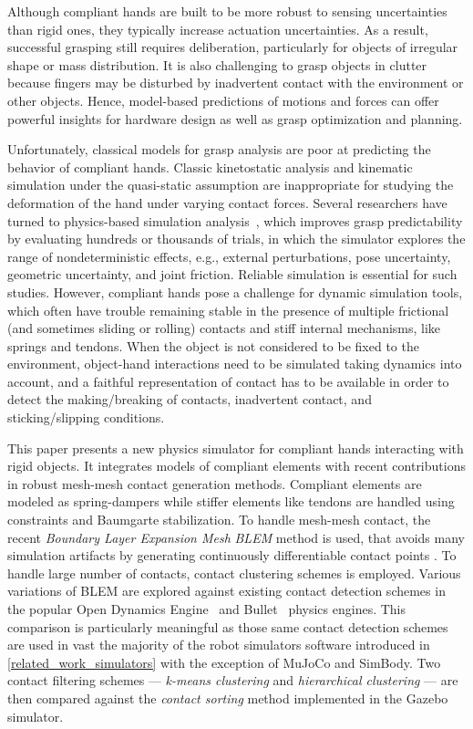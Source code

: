 Although compliant hands are built to be more robust to sensing uncertainties than rigid ones, they typically increase actuation uncertainties. As a result, successful grasping still requires deliberation, particularly for objects of irregular shape or mass distribution. It is also challenging to grasp objects in clutter because fingers may be disturbed by inadvertent contact with the environment or other objects. Hence, model-based predictions of motions and forces can offer powerful insights for hardware design as well as grasp optimization and planning.

Unfortunately, classical models for grasp analysis are poor at predicting the behavior of compliant hands. Classic kinetostatic analysis and kinematic simulation under the quasi-static assumption are inappropriate for studying the deformation of the hand under varying contact forces.  Several researchers have turned to physics-based simulation analysis~\cite{Kappler15, JunggonKim13}, which improves grasp predictability by evaluating hundreds or thousands of trials, in which the simulator explores the range of nondeterministic effects, e.g., external perturbations, pose uncertainty, geometric uncertainty, and joint friction. Reliable simulation is essential for such studies. However, compliant hands pose a challenge for dynamic simulation tools, which often have trouble remaining stable in the presence of multiple frictional (and sometimes sliding or rolling) contacts and stiff internal mechanisms, like springs and tendons. When the object is not considered to be fixed to the environment, object-hand interactions need to be simulated taking dynamics into account, and a faithful representation of contact has to be available in order to detect the making/breaking of contacts, inadvertent contact, and sticking/slipping conditions. 

This paper presents a new physics simulator for compliant hands interacting with rigid objects. It integrates models of compliant elements with recent contributions in robust mesh-mesh contact generation methods.  Compliant elements are modeled as spring-dampers while stiffer elements like tendons are handled using constraints and Baumgarte stabilization.  To handle mesh-mesh contact, the recent \emph{Boundary Layer Expansion Mesh} \emph{BLEM} method is used, that avoids many simulation artifacts by generating continuously differentiable contact points \cite{Hauser13BLEM}. To handle large number of contacts, contact clustering schemes is employed. Various variations of BLEM are explored against existing contact detection schemes in the popular {Open Dynamics Engine}~\cite{opende} and Bullet~\cite{bulletpe} physics engines. This comparison is particularly meaningful as those same contact detection schemes are used in vast the majority of the robot simulators software introduced in \ref{related_work_simulators} with the exception of MuJoCo and SimBody. Two contact filtering schemes ---  \emph{k-means clustering} and \emph{hierarchical clustering} --- are then compared against the \emph{contact sorting} method implemented in the Gazebo simulator.

